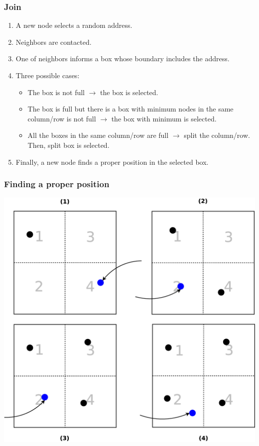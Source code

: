 \documentclass[red]{beamer}
\begin{document}
\begin{frame}
\frametitle{Join}
\begin{enumerate}
\item A new node selects a random address. %
\item Neighbors are contacted.
\item One of neighbors informs a box 
whose boundary includes the address.
\item Three possible cases:
\begin{itemize}
\item The box is not full $\rightarrow$ the box is selected.
\item The box is full but there is a box with minimum nodes in the same column/row is not full $\rightarrow$ the box with minimum is selected. 
\item All the boxes in the same column/row are full $\rightarrow$ split the column/row. Then, split box is selected.
\end{itemize}
\item Finally, a new node finds a proper position in the selected box.
\end{enumerate}
\end{frame}


\begin{frame}
\frametitle{Finding a proper position}
\begin{center}
\includegraphics[scale=0.15]{figs/position.eps}
\end{center}
\end{frame}
\end{document}
